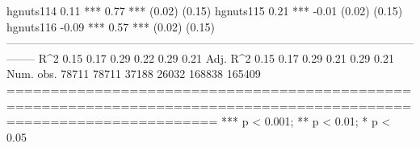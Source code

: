hgnuts114                                                                                    0.11 ***       0.77 ***
                                                                                            (0.02)         (0.15)   
hgnuts115                                                                                    0.21 ***      -0.01    
                                                                                            (0.02)         (0.15)   
hgnuts116                                                                                   -0.09 ***       0.57 ***
                                                                                            (0.02)         (0.15)   
--------------------------------------------------------------------------------------------------------------------
R^2                                 0.15          0.17          0.29          0.22           0.29           0.21    
Adj. R^2                            0.15          0.17          0.29          0.21           0.29           0.21    
Num. obs.                       78711         78711         37188         26032         168838         165409       
====================================================================================================================
*** p < 0.001; ** p < 0.01; * p < 0.05
